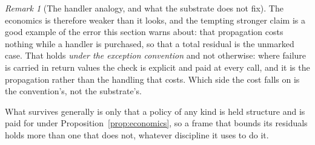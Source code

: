 \documentclass[11pt,a4paper]{article}
\theoremstyle{remark}\newtheorem{remark}[definition]{Remark}
\begin{document}
\begin{remark}[The handler analogy, and what the substrate does not fix]
The economics is therefore weaker than it looks, and the tempting stronger claim is a good example of the error this section warns about: that propagation costs nothing while a handler is purchased, so that a total residual is the unmarked case. That holds \emph{under the
exception convention} and not otherwise: where failure is carried in return values the check is
explicit and paid at every call, and it is the propagation rather than the handling that costs. Which
side the cost falls on is the convention's, not the substrate's.

What survives generally is only that a policy of any kind is held structure and is paid for under
Proposition~\ref{prop:economics}, so a frame that bounds its residuals holds more than one that does
not, whatever discipline it uses to do it.
\end{remark}
\end{document}
